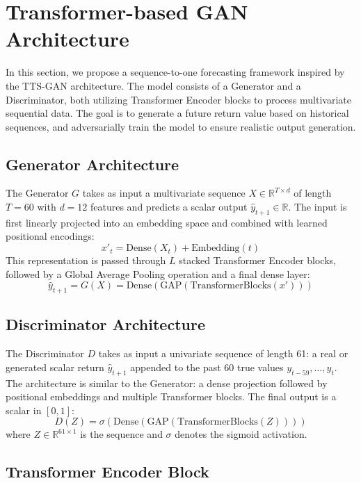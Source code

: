 
\section{Transformer-based GAN Architecture}

In this section, we propose a sequence-to-one forecasting framework inspired by the TTS-GAN architecture. The model consists of a Generator and a Discriminator, both utilizing Transformer Encoder blocks to process multivariate sequential data. The goal is to generate a future return value based on historical sequences, and adversarially train the model to ensure realistic output generation.

\subsection{Generator Architecture}

The Generator $G$ takes as input a multivariate sequence $X \in \mathbb{R}^{T \times d}$ of length $T=60$ with $d=12$ features and predicts a scalar output $\hat{y}_{t+1} \in \mathbb{R}$. The input is first linearly projected into an embedding space and combined with learned positional encodings:
\[
x'_t = \text{Dense}(X_t) + \text{Embedding}(t)
\]
This representation is passed through $L$ stacked Transformer Encoder blocks, followed by a Global Average Pooling operation and a final dense layer:
\[
\hat{y}_{t+1} = G(X) = \text{Dense}(\text{GAP}(\text{TransformerBlocks}(x')))
\]

\subsection{Discriminator Architecture}

The Discriminator $D$ takes as input a univariate sequence of length 61: a real or generated scalar return $\hat{y}_{t+1}$ appended to the past 60 true values $y_{t-59}, \dots, y_t$. The architecture is similar to the Generator: a dense projection followed by positional embeddings and multiple Transformer blocks. The final output is a scalar in $[0, 1]$:
\[
D(Z) = \sigma(\text{Dense}(\text{GAP}(\text{TransformerBlocks}(Z))))
\]
where $Z \in \mathbb{R}^{61 \times 1}$ is the sequence and $\sigma$ denotes the sigmoid activation.

\subsection{Transformer Encoder Block}

